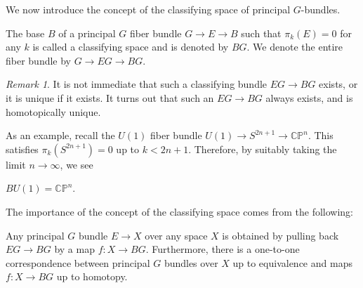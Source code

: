 \documentclass[12pt]{article}
\numberwithin{equation}{section}
\numberwithin{figure}{section}
\theoremstyle{remark}
\newtheorem{remark}[definition]{Remark}
\def\CP{\mathbb{CP}}
\begin{document}
We now introduce the concept of the classifying space of principal $G$-bundles.

\begin{definition}
The base $B$ of a principal $G$ fiber bundle $G\to E\to B$ such that 
$\pi_k(E)=0$ for any $k$
is called a classifying space and is denoted by $BG$.
We denote the entire fiber bundle by $G\to EG\to BG$.
\end{definition}

\begin{remark}
It is not immediate that such a classifying bundle $EG\to BG$ exists,
or it is unique if it exists. 
It turns out that such an $EG\to BG$ always exists, and is homotopically unique.
\end{remark}

As an example, recall the $U(1)$ fiber bundle $U(1)\to S^{2n+1}\to \CP^n$.
This satisfies $\pi_k(S^{2n+1})=0$ up to $k<2n+1$.
Therefore, by suitably taking the limit $n\to \infty$, we see
\begin{example}
$BU(1)=\CP^n$.
\end{example}

The importance of the concept of the classifying space comes from the following:

\begin{theorem}
\label{thm:classifying}
Any principal $G$ bundle $E\to X$ over any space $X$ is obtained by pulling back $EG\to BG$ by a map $f: X\to BG$.
Furthermore, there is a one-to-one correspondence between
principal $G$ bundles over $X$ up to equivalence
and maps $f:X\to BG$ up to homotopy.
\end{theorem}
\end{document}
